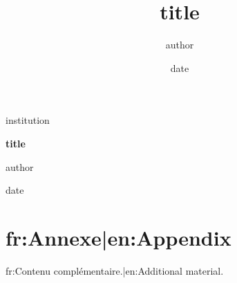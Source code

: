 \documentclass[11pt,a4paper]{report}
\title{{{title}}}
\author{{{author}}}
\date{{{date}}}
\begin{document}
\hypersetup{pageanchor=false}
\begin{titlepage}
  \centering
  {\large {{institution}}\par}
  \vspace*{4cm}
  {\Huge\bfseries {{title}}\par}
  \vspace{2cm}
  {\Large {{author}}\par}
  \vfill
  {\large {{date}}\par}
\end{titlepage}
\hypersetup{pageanchor=true}

\tableofcontents





\printbibliography[heading=bibintoc]

\appendix
\chapter{{{fr:Annexe|en:Appendix}}}
{{fr:Contenu complémentaire.|en:Additional material.}}
\end{document}
